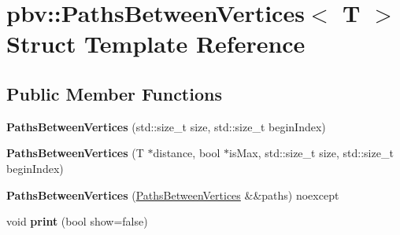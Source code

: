 \hypertarget{structpbv_1_1_paths_between_vertices}{}\section{pbv\+:\+:Paths\+Between\+Vertices$<$ T $>$ Struct Template Reference}
\label{structpbv_1_1_paths_between_vertices}
\subsection*{Public Member Functions}
\begin{DoxyCompactItemize}
\item 
\mbox{\label{structpbv_1_1_paths_between_vertices_a352d3e86d9e9776ad7c9ec69844d5651}} 
{\bfseries Paths\+Between\+Vertices} (std\+::size\+\_\+t size, std\+::size\+\_\+t begin\+Index)
\item 
\mbox{\label{structpbv_1_1_paths_between_vertices_a774e36d73a973b9e301e4dbce74b7b29}} 
{\bfseries Paths\+Between\+Vertices} (T $\ast$distance, bool $\ast$is\+Max, std\+::size\+\_\+t size, std\+::size\+\_\+t begin\+Index)
\item 
\mbox{\label{structpbv_1_1_paths_between_vertices_a7b7fadc0fedb587ae9b7deb62ebb6a1c}} 
{\bfseries Paths\+Between\+Vertices} (\mbox{\hyperlink{structpbv_1_1_paths_between_vertices}{Paths\+Between\+Vertices}} \&\&paths) noexcept
\item 
\mbox{\label{structpbv_1_1_paths_between_vertices_aca6583521b4e35eec9db20c901f200e6}} 
void {\bfseries print} (bool show=false)
\end{DoxyCompactItemize}

